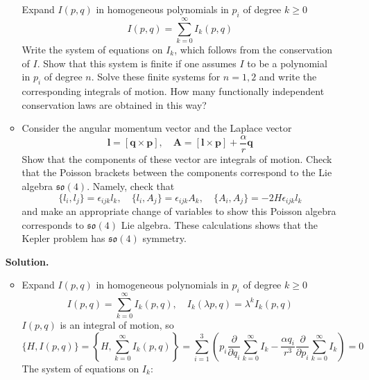 \documentclass[12pt]{article}
\theoremstyle{definition}
\begin{document}
\begin{enumerate}
\begin{itemize}
\begin{equation}
        \end{equation}
        Expand $I(p,q)$ in homogeneous polynomials in $p_i$ of degree $k\geq0$
        \begin{equation}
            I(p,q)=\sum\limits_{k=0}^\infty I_k(p,q)
        \end{equation}
        Write the system of equations on $I_k$, which follows from the conservation of $I$. Show that this system is finite if one assumes $I$ to be a polynomial in $p_i$ of degree $n$. Solve these finite systems for $n = 1, 2$ and write the corresponding integrals of motion. How many functionally independent conservation laws are obtained in this way?
        \item Consider the angular momentum vector and the Laplace vector
        \begin{equation}
            \bm{l}=[\bm{q}\times\bm{p}],\quad\bm{A}=[\bm{l}\times\bm{p}]+\frac{\alpha}{r}\bm{q}
        \end{equation}
        Show that the components of these vector are integrals of motion. Check that the Poisson brackets between the components correspond to the Lie algebra $\mathfrak{so}(4)$. Namely, check that
        \begin{equation}
            \{l_i,l_j\}=\epsilon_{ijk}l_k,\quad\{l_i,A_j\}=\epsilon_{ijk}A_k,\quad \{A_i,A_j\}=-2H\epsilon_{ijk}l_k
        \end{equation}
        and make an appropriate change of variables to show this Poisson algebra corresponds to $\mathfrak{so}(4)$ Lie algebra. These calculations shows that the Kepler problem has $\mathfrak{so}(4)$ symmetry.
    \end{itemize}
    \textbf{Solution.}
    \begin{itemize}
        \item Expand $I(p,q)$ in homogeneous polynomials in $p_i$ of degree $k\geq0$
        \begin{equation}
            I(p,q)=\sum\limits_{k=0}^\infty I_k(p,q),\quad I_k(\lambda p,q)=\lambda^kI_k(p,q)
        \end{equation}
        $I(p,q)$ is an integral of motion, so
        \begin{equation}
            \{H,I(p,q)\}=\left\{H,\sum\limits_{k=0}^\infty I_k(p,q)\right\}=\sum\limits_{i=1}^3\left(p_i\frac{\partial}{\partial q_i}\sum\limits_{k=0}^\infty I_k-\frac{\alpha q_i}{r^3}\frac{\partial}{\partial p_i}\sum\limits_{k=0}^\infty I_k\right)=0
        \end{equation}
        The system of equations on $I_k$:

\end{itemize}
\end{enumerate}
\end{document}
